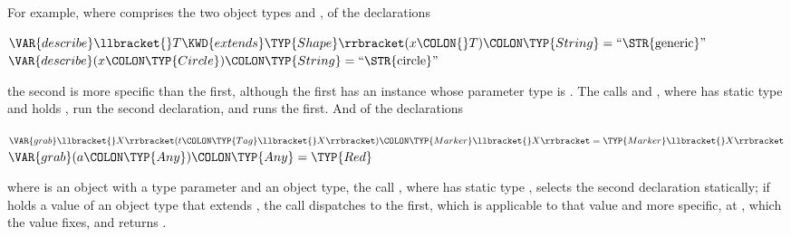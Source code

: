For example, where  comprises the two object types 
and , of the declarations
\begin{Fortress}
\(\VAR{describe}\llbracket{}T \KWD{extends} \TYP{Shape}\rrbracket(x\COLON{}T)\COLON \TYP{String} = \hbox{\rm``\STR{generic}''}\)\\
\(\VAR{describe}(x\COLON \TYP{Circle})\COLON \TYP{String} = \hbox{\rm``\STR{circle}''}\)
\end{Fortress}
the second is more specific than the first, although the first has an instance
whose parameter type is .
The calls  and , where
 has static type  and holds , run the second
declaration, and  runs the first.
And of the declarations
\begin{Fortress}
\(\VAR{grab}\llbracket{}X\rrbracket(t\COLON \TYP{Tag}\llbracket{}X\rrbracket)\COLON \TYP{Marker}\llbracket{}X\rrbracket = \TYP{Marker}\llbracket{}X\rrbracket\)\\
\(\VAR{grab}(a\COLON \TYP{Any})\COLON \TYP{Any} = \TYP{Red}\)
\end{Fortress}
where  is an object with a type parameter and  an object
type, the call , where  has static type ,
selects the second declaration statically; if  holds a value of an
object type that extends , the
call dispatches to the first, which is applicable to that value and more
specific, at , which the value fixes, and returns
.
